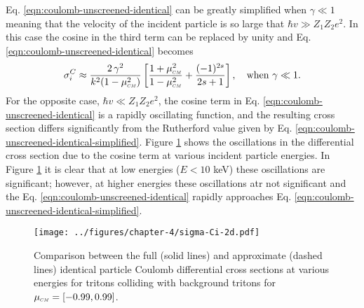 Eq. \eqref{eqn:coulomb-unscreened-identical} can be greatly simplified when $\gamma \ll 1$ meaning that the velocity of the incident particle is so large that $\hbar v \gg Z_1 Z_2 e^2$. In this case the cosine in the third term can be replaced by unity and Eq. \eqref{eqn:coulomb-unscreened-identical} becomes
\begin{equation} \label{eqn:coulomb-unscreened-identical-simplified}
   \sigma_{i}^{C} \approx \dfrac{2 \, \gamma^2}{k^2 (1 - \mucm^2)} \left[\dfrac{1+ \mucm^2}{1-\mucm^2} + \dfrac{(-1)^{2s}}{2s+1}\right], \quad \text{when} \,\, \gamma \ll 1.
\end{equation}
For the opposite case, $\hbar v \ll Z_1 Z_2 e^2$, the cosine term in Eq. \eqref{eqn:coulomb-unscreened-identical} is a rapidly oscillating function, and the resulting cross section differs significantly from the Rutherford value given by Eq. \eqref{eqn:coulomb-unscreened-identical-simplified}. Figure \ref{fig:coulomb-identical-2d} shows the oscillations in the differential cross section due to the cosine term at various incident particle energies. In Figure \ref{fig:coulomb-identical-2d} it is clear that at low energies ($E < 10$ keV) these oscillations are significant; however, at higher energies these oscillations atr not significant and the Eq. \eqref{eqn:coulomb-unscreened-identical} rapidly approaches Eq. \eqref{eqn:coulomb-unscreened-identical-simplified}.

\begin{figure}[!htb]
    \centering
    \texttt{[image: ../figures/chapter-4/sigma-Ci-2d.pdf]}
    \caption{Comparison between the full (solid lines) and approximate (dashed lines) identical particle Coulomb differential cross sections at various energies for tritons colliding with background tritons for $\mucm = [-0.99,0.99]$.}
    \label{fig:coulomb-identical-2d}
\end{figure}

